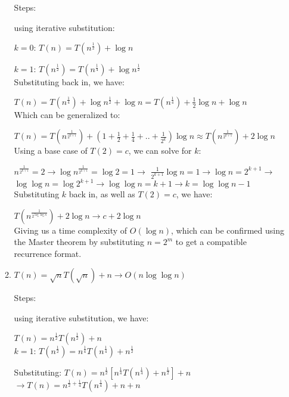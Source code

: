 \documentclass[12pt]{article}
\begin{document}
\begin{enumerate}
\begin{enumerate}
        Steps:

        using iterative substitution:

        $k = 0$: $T(n) = T(n^\frac{1}{2}) + \log n$

        $k = 1$: $T(n^\frac{1}{2}) = T(n^\frac{1}{4}) + \log n^\frac{1}{2}$\\

        Substituting back in, we have:

        $T(n) = T(n^\frac{1}{4}) + \log n^\frac{1}{2} + \log n = T(n^\frac{1}{4}) + \frac{1}{2}\log n + \log n$\\

        Which can be generalized to:

        $T(n) = T(n^\frac{1}{2^{k + 1}}) + (1 + \frac{1}{2} + \frac{1}{4} + .. + \frac{1}{2^k}) \log n \approx T(n^\frac{1}{2^{k + 1}}) + 2\log n$\\

        Using a base case of $T(2) = c$, we can solve for $k$:

        $n^\frac{1}{2^{k+1}} = 2 \longrightarrow \log n^\frac{1}{2^{k+1}} = \log2 = 1 \longrightarrow$
        $\frac{1}{2^{k + 1}}\log n = 1 \longrightarrow \log n = 2^{k + 1} \longrightarrow$ \\
        $\log\log n = \log 2^{k + 1} \longrightarrow \log\log n = k + 1 \longrightarrow k = \log\log n - 1$\\

        Substituting $k$ back in, as well as $T(2) = c$, we have:
        
        $T(n^\frac{1}{2^{\log\log n}}) + 2\log n \longrightarrow c + 2\log n$\\

        Giving us a time complexity of $O(\log n)$, which can be confirmed using the Master theorem by substituting 
        $n = 2^m$ to get a compatible recurrence format.

        \item $T(n) = \sqrt{n}T(\sqrt{n}) + n \longrightarrow O(n\log\log n)$
        
        Steps:

        using iterative substitution, we have:

        $T(n) = n^\frac{1}{2}T(n^\frac{1}{2}) + n$\\

        $k = 1$: $T(n^\frac{1}{2}) = n^\frac{1}{4}T(n^\frac{1}{4}) + n^\frac{1}{2}$
        
        Substituting: $T(n) = n^\frac{1}{2}[n^\frac{1}{4}T(n^\frac{1}{4}) + n^\frac{1}{2}] + n$
        $\longrightarrow T(n) = n^{\frac{1}{2} + \frac{1}{4}}T(n^\frac{1}{4}) + n + n$\\


\end{enumerate}
\end{enumerate}
\end{document}
